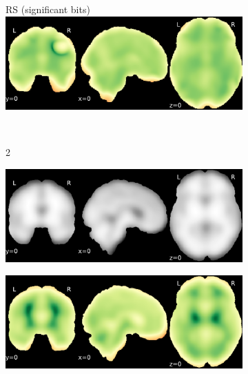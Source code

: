 \documentclass{article}
\begin{document}
\begin{appendices}
\begin{landscape}
\begin{figure}
\begin{subfigure}[t]{0.2\paperheight}
            \end{subfigure}
            \begin{subfigure}[t]{0.2\paperheight}
                \centering
                RS (significant bits)
                \includegraphics[width=\textwidth]{figures/sig/20mm/rs_ds001600_sub-1_sig.pdf}
            \end{subfigure} \\
            \begin{subfigure}[b][][c]{0.01\paperwidth} 2 \vspace*{15pt} \end{subfigure}
            \begin{subfigure}[t]{0.2\paperheight}
                \centering
                \includegraphics[width=\textwidth]{figures/sig/20mm/ieee_ds001771_sub-36.pdf}
            \end{subfigure}
            \begin{subfigure}[t]{0.2\paperheight}
                \centering
                \includegraphics[width=\textwidth]{figures/sig/20mm/rr_ds001771_sub-36_sig.pdf}

\end{subfigure}
\end{figure}
\end{landscape}
\end{appendices}
\end{document}
